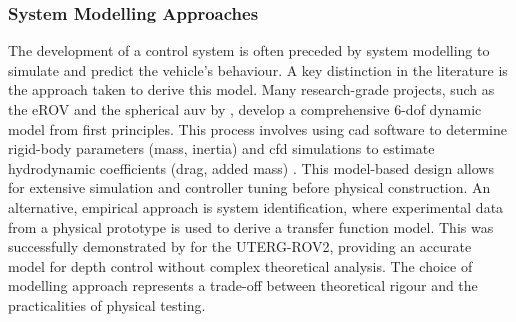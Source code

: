 \documentclass[11pt, a4paper]{article}
\begin{document}
\subsubsection{System Modelling Approaches}
The development of a control system is often preceded by system modelling to simulate and predict the vehicle's behaviour. A key distinction in the literature is the approach taken to derive this model. Many research-grade projects, such as the eROV and the spherical \gls{auv} by \citet{7790672}, develop a comprehensive 6-\gls{dof} dynamic model from first principles. This process involves using \gls{cad} software to determine rigid-body parameters (mass, inertia) and \gls{cfd} simulations to estimate hydrodynamic coefficients (drag, added mass) \cite{8615595, 10200265}. This model-based design allows for extensive simulation and controller tuning before physical construction. An alternative, empirical approach is system identification, where experimental data from a physical prototype is used to derive a transfer function model. This was successfully demonstrated by \citet{7244902} for the UTERG-ROV2, providing an accurate model for depth control without complex theoretical analysis. The choice of modelling approach represents a trade-off between theoretical rigour and the practicalities of physical testing.
\end{document}
